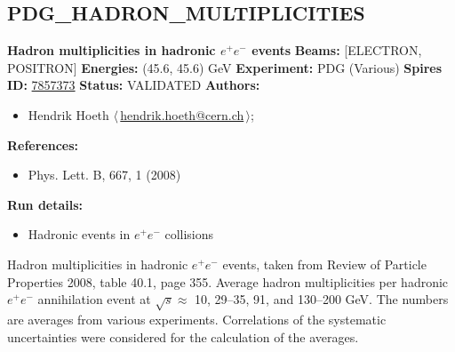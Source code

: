 \clearpage


\clearpage

\subsection[PDG\_HADRON\_MULTIPLICITIES]{PDG\_HADRON\_MULTIPLICITIES\,\cite{Amsler:2008zzb}}
\textbf{Hadron multiplicities in hadronic $e^+e^-$ events}\newline
\textbf{Beams:} [ELECTRON, POSITRON] \newline
\textbf{Energies:} (45.6, 45.6) GeV \newline
\textbf{Experiment:} PDG (Various) \newline
\textbf{Spires ID:} \href{http://www.slac.stanford.edu/spires/find/hep/www?rawcmd=key+7857373}{7857373}\newline
\textbf{Status:} VALIDATED\newline
\textbf{Authors:}
\begin{itemize}
  \item Hendrik Hoeth $\langle\,$\href{mailto:hendrik.hoeth@cern.ch}{hendrik.hoeth@cern.ch}$\,\rangle$;
\end{itemize}
\textbf{References:}
\begin{itemize}
  \item Phys. Lett. B, 667, 1 (2008)
\end{itemize}
\textbf{Run details:}
\begin{itemize}

  \item Hadronic events in $e^+ e^-$ collisions\end{itemize}

\noindent Hadron multiplicities in hadronic $e^+e^-$ events, taken from Review of Particle Properties 2008, table 40.1, page 355.   Average hadron multiplicities per hadronic $e^+e^-$ annihilation event at $\sqrt{s} \approx {}$ 10, 29--35, 91, and 130--200 GeV. The numbers are averages from various experiments. Correlations of the systematic uncertainties were considered for the calculation of the averages.

\clearpage


\clearpage

